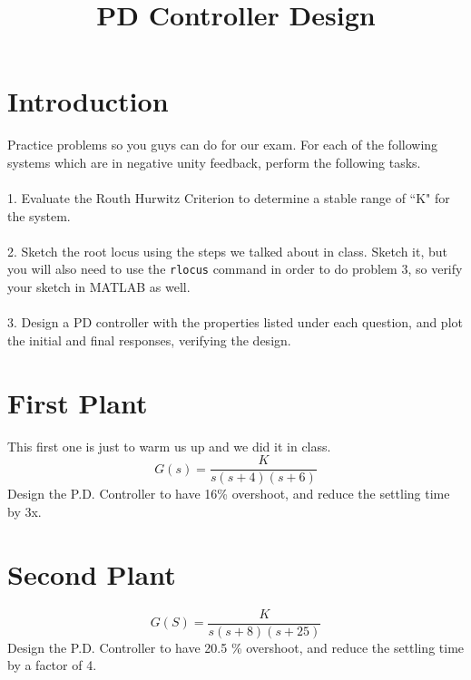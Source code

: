 \documentclass[10pt,a4paper]{article}
\title{PD Controller Design}
\begin{document}
\maketitle
\section*{Introduction}
Practice problems so you guys can do for our exam. For each of the following systems which are in negative unity feedback, perform the following tasks.
\\ \\ 
1. Evaluate the Routh Hurwitz Criterion to determine a stable range of ``K" for the system.
\\ \\ 
2.  Sketch the root locus using the steps we talked about in class. Sketch it, but you will also need to use the \texttt{rlocus} command in order to do problem 3, so verify your sketch in MATLAB as well.
\\ \\
3.  Design a PD controller with the properties listed under each question, and plot the initial and final responses, verifying the design.
\section{First Plant}
This first one is just to warm us up and we did it in class.
\begin{equation*}
G(s) = \frac{K}{s(s+4)(s+6)}
\end{equation*}
Design the P.D. Controller to have 16\% overshoot, and reduce the settling time by 3x.  
\section{Second Plant}
\begin{equation*}
G(S) = \frac{K}{s(s+8)(s+25)}
\end{equation*}
Design the P.D. Controller to have 20.5 \% overshoot, and reduce the settling time by a factor of 4. 
\end{document}
